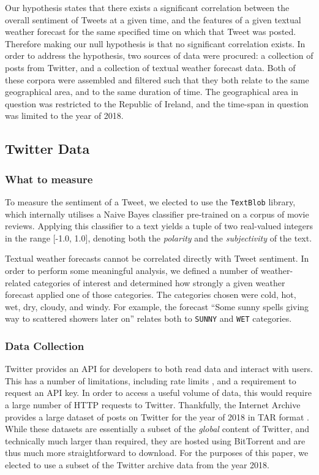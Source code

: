 \documentclass[a4paper,10pt]{article}
\begin{document}
    Our hypothesis states that there exists a significant correlation between the overall sentiment of Tweets at a given time, and the features of a given textual weather forecast for the same specified time on which that Tweet was posted. Therefore making our null hypothesis is that no significant correlation exists. In order to address the hypothesis, two sources of data were procured: a collection of posts from Twitter, and a collection of textual weather forecast data. Both of these corpora were assembled and filtered such that they both relate to the same geographical area, and to the same duration of time. The geographical area in question was restricted to the Republic of Ireland, and the time-span in question was limited to the year of 2018. 

    \subsection{Twitter Data}

    \subsubsection{What to measure}

    To measure the sentiment of a Tweet, we elected to use the \texttt{TextBlob}  library, which internally utilises a Naive Bayes classifier pre-trained on a corpus of movie reviews. Applying this classifier to a text yields a tuple of two real-valued integers in the range [-1.0, 1.0], denoting both the \textit{polarity} and the \textit{subjectivity} of the text.

    Textual weather forecasts cannot be correlated directly with Tweet sentiment. In order to perform some meaningful analysis, we defined a number of weather-related categories of interest and determined how strongly a given weather forecast applied one of those categories. The categories chosen were cold, hot, wet, dry, cloudy, and windy. For example, the forecast ``Some sunny spells giving way to scattered showers later on'' relates both to \texttt{SUNNY} and \texttt{WET} categories.

    \subsubsection{Data Collection}

    Twitter provides an API for developers to both read data and interact with users. This has a number of limitations, including rate limits , and a requirement to request an API key. In order to access a useful volume of data, this would require a large number of HTTP requests to Twitter. Thankfully, the Internet Archive provides a large dataset of posts on Twitter for the year of 2018 in TAR format . While these datasets are essentially a subset of the \textit{global} content of Twitter, and technically much larger than required, they are hosted using BitTorrent and are thus much more straightforward to download. For the purposes of this paper, we elected to use a subset of the Twitter archive data from the year 2018.
\end{document}
